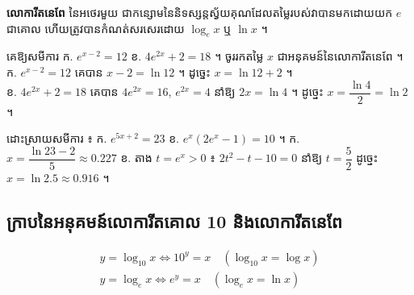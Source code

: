 \begin{definition}[និយមន័យ]
\textbf{លោការីតនេពែ} នៃអថេរមួយ ជាកន្សោមនៃនិទស្សន្តស្វ័យគុណដែលតម្លៃរបស់វាបានមកដោយយក $e$ ជាគោល ហើយត្រូវបានកំណត់សរសេរដោយ $\log_e x$ ឬ $\ln x$ ។
\end{definition}

\begin{example}[លំហាត់គំរូ]
គេឱ្យសមីការ ក. $e^{x - 2} = 12$ \quad ខ. $4e^{2x} + 2 = 18$ ។ ចូររកតម្លៃ $x$ ជាអនុគមន៍នៃលោការីតនេពែ ។
\ans
ក. $e^{x - 2} = 12$ គេបាន $x - 2 = \ln 12$ ។ ដូច្នេះ $x = \ln 12 + 2$ ។\\
ខ. $4e^{2x} + 2 = 18$ គេបាន $4e^{2x} = 16$, $e^{2x} = 4$ នាំឱ្យ $2x = \ln 4$ ។ ដូច្នេះ $x = \dfrac{\ln 4}{2} = \ln 2$ ។
\end{example}

\begin{pro}
ដោះស្រាយសមីការ ៖ \quad ក. $e^{5x + 2} = 23$ \quad ខ. $e^x(2e^x - 1) = 10$ ។
\ans
ក. $x = \dfrac{\ln 23 - 2}{5} \approx 0.227$ \quad ខ. តាង $t = e^x > 0$ ៖ $2t^2 - t - 10 = 0$ នាំឱ្យ $t = \dfrac{5}{2}$ ដូច្នេះ $x = \ln 2.5 \approx 0.916$ ។
\end{pro}

\subsection{ក្រាបនៃអនុគមន៍លោការីតគោល 10 និងលោការីតនេពែ}
\[
\begin{gathered}
y = \log_{10} x \iff 10^y = x \quad (\log_{10} x = \log x)\\
y = \log_e x \iff e^y = x \quad (\log_e x = \ln x)
\end{gathered}
\]
\begin{center}
\end{center}

